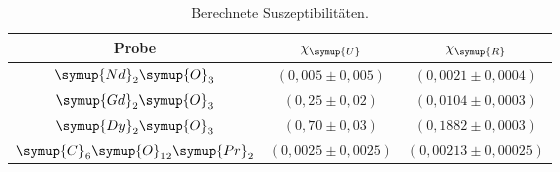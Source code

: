 \begin{table}[!htp]
\centering
\caption{Berechnete Suszeptibilitäten.}
\label{tab:suszep}
\begin{tabular}{c c c}
\toprule
{Probe} & {$\chi_{\symup{U}}$} & {$\chi_{\symup{R}}$} \\
\midrule
$\symup{Nd}_2\symup{O}_3$               & $(0,005 \pm 0,005)$   &    $(0,0021 \pm 0,0004)$  \\
$\symup{Gd}_2\symup{O}_3 $              & $(0,25 \pm 0,02)$    &    $ (0,0104 \pm 0,0003)$ \\
$\symup{Dy}_2\symup{O}_3$               & $(0,70 \pm 0,03)$     &    $(0,1882 \pm 0,0003)$  \\
$\symup{C}_6\symup{O}_{12}\symup{Pr}_2$ & $(0,0025 \pm 0,0025)$ &    $(0,00213 \pm 0,00025)$\\
\bottomrule
\end{tabular}
\end{table}